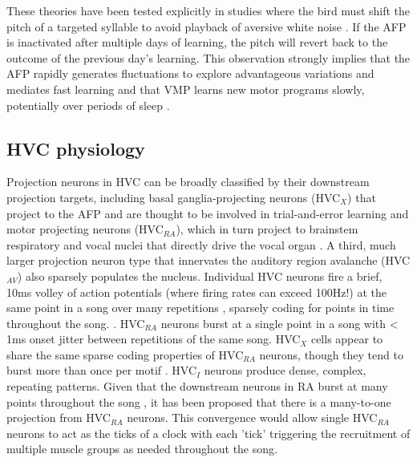 These theories have been tested explicitly in studies where the bird must shift the pitch of a targeted syllable to avoid playback of aversive white noise \cite{Andalman2009-lj} \cite{Tumer2007-oj}. If the AFP is inactivated after multiple days of learning, the pitch will revert back to the outcome of the previous day's learning. \cite{Tumer2007-oj} This observation strongly implies that the AFP rapidly generates fluctuations to explore advantageous variations and mediates fast learning and that VMP learns new motor programs slowly, potentially over periods of sleep \cite{Andalman2009-lj}.  


\subsection{HVC physiology}

Projection neurons in HVC can be broadly classified by their downstream projection targets, including basal ganglia-projecting neurons (HVC$_{X}$) that project to the AFP and are thought to be involved in trial-and-error learning and motor projecting neurons (HVC$_{RA}$), which in turn project to brainstem respiratory and vocal nuclei that directly drive the vocal organ \cite{Krutzfeldt2004-po}. A third, much larger projection neuron type that innervates the auditory region avalanche (HVC$_{AV}$) also sparsely populates the nucleus.
Individual HVC neurons fire a brief, 10ms volley of action potentials (where firing rates can exceed 100Hz!) at the same point in a song over many repetitions \cite{McCasland1987-cf}, sparsely coding for points in time throughout the song. \cite{Hahnloser2002-nl}. HVC$_{RA}$ neurons burst at a single point in a song with < 1ms onset jitter between repetitions of the same song. HVC$_{X}$ cells appear to share the same sparse coding properties of HVC$_{RA}$ neurons, though they tend to burst more than once per motif \cite{Kozhevnikov2007-jz}. HVC$_{I}$ neurons produce dense, complex, repeating patterns. Given that the downstream neurons in RA burst at many points throughout the song \cite{Leonardo2005-up}, it has been proposed that there is a many-to-one projection from HVC$_{RA}$ neurons. This convergence would allow single HVC$_{RA}$ neurons to act as the ticks of a clock with each 'tick' triggering the recruitment of multiple muscle groups as needed throughout the song.
 
